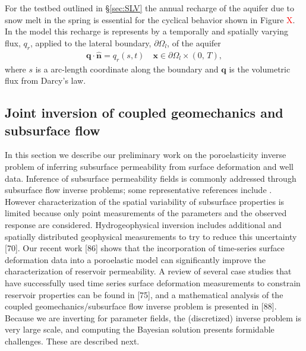 \documentclass[11pt,final]{article}%
\newcommand{\note}[1]{\textcolor{red}{ #1}}
\renewcommand{\citep}{\cite}
\begin{document}
For the testbed outlined in \S\ref{sec:SLV} the annual recharge of the aquifer due to snow melt in the spring is essential for the cyclical behavior shown in Figure \note{X}. In the model this recharge is represents by a temporally and spatially varying flux, $q_r$, applied to the lateral boundary, $\partial\Omega_l$, of the aquifer
\begin{align}
    \mathbf{q}\cdot\hat{\mathbf{n}} = q_r(s,t)\quad \mathbf{x} \in \partial\Omega_l \times (0,\,T),
\end{align}
where $s$ is a arc-length coordinate along the boundary and $\mathbf{q}$ is the volumetric flux from Darcy's law.



\subsection{Joint inversion of coupled geomechanics and subsurface flow}
In this section we describe our preliminary work on the poroelasticity inverse problem of inferring subsurface permeability from surface deformation and well data. Inference of subsurface permeability fields is commonly addressed through
subsurface flow inverse problems; some representative references include \citep{Carrera1986a,Carrera1986b,Carrera1986c,McLaughlin1996,Bohling2010,Cardiff2011,Cardiff2012,Berg2015,Yoon2017}. 
However characterization of the spatial variability of subsurface properties is limited because only point measurements of the parameters and the observed response are considered. Hydrogeophysical inversion includes additional and spatially distributed geophysical measurements to try to reduce this
uncertainty [70]. Our recent work [86] shows that the incorporation of time-series surface deformation data into a poroelastic model can significantly improve the characterization of reservoir permeability. A review of several case studies that have successfully used time series surface deformation measurements
to constrain reservoir properties can be found in [75], and a mathematical analysis of the coupled geomechanics/subsurface flow inverse problem is presented in [88]. Because we are inverting for parameter fields, the (discretized) inverse problem is very large scale, and computing the Bayesian solution presents formidable challenges. These are described next.
\end{document}
